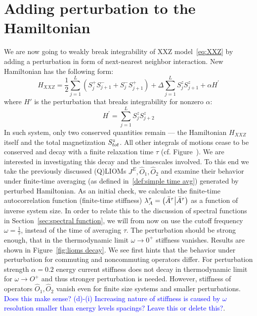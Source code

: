\section{Adding perturbation to the Hamiltonian}
We are now going to weakly break integrability of XXZ model~\eqref{eq:XXZ} 
by adding a perturbation in form of next-nearest neighbor interaction.
New Hamiltonian has the following form:
\begin{equation}
    H_{XXZ} = \frac{1}{2}\sum_{j = 1}^{L}\left( S^{+}_{j} S^{-}_{j+1} + 
    S^{-}_{j}S^{+}_{j+1} \right) + \Delta\sum_{j = 1}^{L} S^{z}_{j}S^{z}_{j+1}
    + \alpha H^{\prime}
    \label{eq:HXXZ perturbed}
\end{equation}
where \(H'\) is the perturbation that breaks integrability for nonzero \(\alpha \):
\begin{equation}
    H^{\prime}=\sum_{j = 1}^{L} S^{z}_{j}S^{z}_{j+2}
    \label{eq:perturbation}
\end{equation}
In such system, only two conserved quantities remain --- the Hamiltonian \(H_{XXZ}\) itself 
and the total magnetization \(S^{z}_{tot}\). All other integrals of motions cease to be conserved
and decay with a finite relaxation time \(\tau\) (cf. Figure~).
We are interested in investigating this decay and the timescales involved.
To this end we take the previously discussed (Q)LIOMs \(J^E, \hat{O}_1,\hat{O}_2\)
and examine their behavior under finite-time averaging 
(as defined in~\eqref{def:simple time avg}) generated by perturbed Hamiltonian.
As an initial check, we calculate the finite-time autocorrelation function (finite-time stiffness)
\(\lambda^{\tau}_A = \left(\bar{A}^{\tau} \middle| \bar{A}^{\tau}\right)\) as a function of inverse system size.
In order to relate this to the discussion of spectral functions in Section~\ref{sec:spectral function},
we will from now on use the cutoff frequency \(\omega = \frac{1}{\tau}\), instead of the time of
averaging \(\tau\). The perturbation should be strong enough, that in the thermodynamic limit
\(\omega \to 0^+\) stiffness vanishes. Results are shown in Figure~\ref{fig:lioms decay}.
We see first hints that the behavior under perturbation for commuting and noncommuting operators
differ. For perturbation strength \(\alpha=0.2\) energy current stiffness does
not decay in thermodynamic limit for \(\omega \to O^+\) and thus stronger perturbation is needed.
However, stiffness of operators \(\hat{O}_1,\hat{O}_2\) vanish even for finite size systems
and smaller perturbations. 
\textcolor{blue}{Does this make sense? (d)-(i) Increasing nature of
stiffness is caused by \(\omega\) resolution smaller than energy levels spacings? Leave this or
delete this?}.
